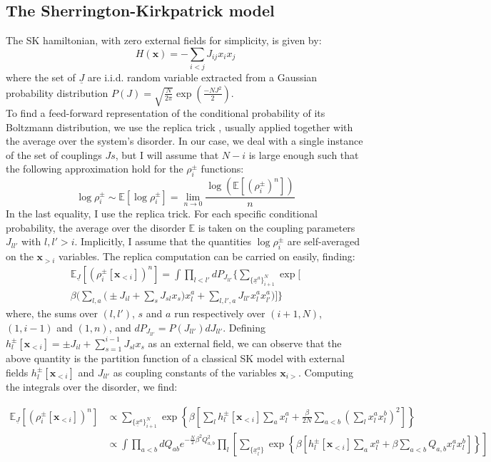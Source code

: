 \documentclass[aps,physrev,10pt,floatfix,reprint]{revtex4-2}
\begin{document}
\subsection{The Sherrington-Kirkpatrick model}
The SK hamiltonian, with zero external fields for simplicity, is given by:
\begin{equation}
H\left(\mathbf{x}\right)=-\sum_{i<j}J_{ij}x_{i}x_{j}
\end{equation}
where the set of $\underline{J}$ are i.i.d. random variable extracted from a Gaussian probability distribution $P(J)=\sqrt{\frac{N}{2\pi}}\exp\left(\frac{-NJ^2}{2} \right)$. \\
To find a feed-forward representation of the conditional probability of its Boltzmann distribution, we use the replica trick \cite{10.1142/0271}, usually applied together with the average over the system's disorder. In our case, we deal with a single instance of the set of couplings $Js$, but I will assume that $N-i$ is large enough such that the following approximation hold for the $\rho_i^{\pm}$ functions: 
\[
\log\rho_i^{\pm} \sim \mathbb{E}\left[  \log\rho_i^{\pm} \right] = \lim_{n\rightarrow 0} \frac{  \log(\mathbb{E}\left[(\rho_i^{\pm})^n \right])}{n}
\]
In the last equality, I use the replica trick. 
For each specific conditional probability, the average over the disorder $\mathbb{E}$ is taken on the coupling parameters $J_{ll'}$ with $l,l'>i$. Implicitly, I assume that the quantities $\log\rho_i^{\pm}$ are self-averaged on the $\mathbf{x}_{>i}$ variables.
 The replica computation can be carried on easily, finding:
\begin{multline}
\mathbb{E}_{\underline{J}}\left[(\rho_i^{\pm}[\mathbf{x}_{<i}])^n \right]  = 
\int \prod_{l<l'} dP_{J_{ll'}} \bigg\{ 
\sum_{\{\underline{x}^{a}\}_{i+1}^N} \exp\bigg[\\ \beta \bigg( 
\sum_{l,a}\bigg( \pm J_{il}  
+ \sum_{s} J_{sl} x_s \bigg) x_l^{a} + 
\sum_{l,l', a} J_{ll'} x_l^{a} x_{l'}^{a}
\bigg)  \bigg] 
\bigg\}
\end{multline}
where, the sums over $(l,l')$, $s$ and $a$ run respectively over $(i+1,N)$, $(1,i-1)$ and $(1,n)$, and $dP_{J_{ll'}}=P(J_{ll'})dJ_{ll'}$. Defining $h_l^{\pm}[\mathbf{x}_{<i}] =\pm J_{il} + \sum_{s=1}^{i-1} J_{sl} x_s$ as an external field, we can observe that the above quantity is the partition function of a classical SK model with external fields $h_l^{\pm}[\mathbf{x}_{<i}]$ and $J_{ll'}$ as coupling constants of the variables $\mathbf{x}_{i>}$.  
Computing the integrals over the disorder, we find: 
\begin{widetext}
\begin{align}
\mathbb{E}_{\underline{J}}\left[(\rho_i^{\pm}[\mathbf{x}_{<i}])^n \right]
& \propto  
\sum_{\{\underline{x}^{a}\}_{i+1}^N} 
\exp\left\{\beta \left[
\sum_{l} h_l^{\pm}[\mathbf{x}_{<i}] \sum_{a} x_l^{a} +\frac{\beta}{2N} \sum_{a<b} \left( \sum_{l}  x_l^{a} x_l^{b} \right)^2 \right]  \right\}\\
& \propto  \int \prod_{a<b} dQ_{ab} e^{-\frac{N}{2}\beta^2Q_{a,b}^2}
\prod_{l} \left[
\sum_{\{\underline{x}^{a}_l\}} 
\exp\left\{\beta \left[
h_l^{\pm}[\mathbf{x}_{<i}] \sum_{a} x_l^{a} +\beta \sum_{a<b} Q_{a,b}  x_l^{a} x_l^{b} \right]  \right\}
\right]
\end{align}
\end{widetext}
\end{document}
